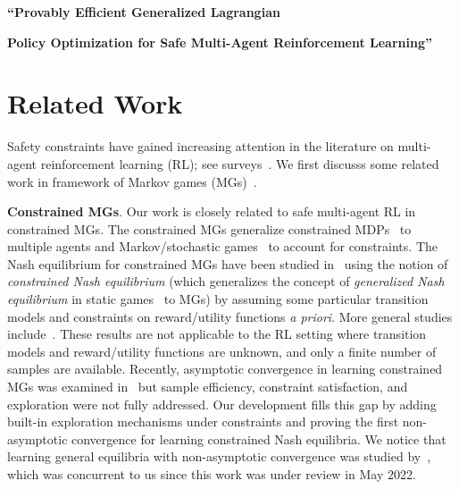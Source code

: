 \documentclass[12pt, final]{l4dc2023}
\begin{document}
\vspace{6pt}
\centerline{{\fontsize{14}{14}\selectfont
		\textbf{``Provably Efficient Generalized Lagrangian }}}

\vspace{6pt}
\centerline{\fontsize{14}{14}\selectfont \textbf{
		Policy Optimization for Safe Multi-Agent Reinforcement Learning''}}
\vspace{10pt}


\section{Related Work}\label{ap.related}

Safety constraints have gained increasing attention in the literature on multi-agent reinforcement learning (RL); see surveys~\citep{busoniu2008comprehensive,bucsoniu2010multi,zhang2019multi,oroojlooyjadid2019review,yang2020overview,schmidt2022introduction}. We first discusss some related work in framework of Markov games (MGs)~\citep{shapley1953stochastic,littman1994markov}.

\noindent\textbf{Constrained MGs}. 
Our work is closely related to safe multi-agent RL in constrained MGs. 
The constrained MGs generalize constrained MDPs~\citep{altman1999constrained} to multiple agents and Markov/stochastic games~\citep{shapley1953stochastic,littman1994markov} to account for constraints. The Nash equilibrium for constrained MGs have been studied in~\cite{altman2000constrained,gomez2003saddle,altman2005zero,alvarez2006existence,altman2007constrained,altman2008constrained,altman2009constrained,singh2014characterization} using the notion of \emph{constrained Nash equilibrium} (which generalizes the concept of \emph{generalized Nash equilibrium} in static games~\citep{arrow1954existence} to MGs) by assuming some particular transition models and constraints on reward/utility functions \emph{a priori}. More general studies include~\cite{yaji2015necessary,zhang2019discrete,wei2020discrete,wei2021constrained,zhang2021constrained}. These results are not applicable to the RL setting where transition models and reward/utility functions are unknown, and only a finite number of samples are available. Recently, asymptotic convergence in learning constrained MGs was examined in~\cite{hakami2015learning,jiang2020finding} but sample efficiency, constraint satisfaction, and exploration were not fully addressed. Our development fills this gap by adding built-in exploration mechanisms under constraints and proving the first non-asymptotic convergence for learning constrained Nash equilibria. We notice that learning general equilibria with non-asymptotic convergence was studied by~\cite{
	chenfinding}, which was concurrent to us since this work was under review in May 2022. 
\end{document}

